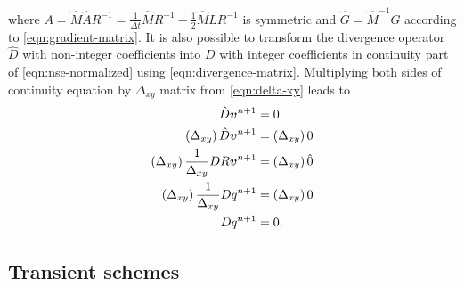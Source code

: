 \documentclass{article}
\numberwithin{equation}{section}
\begin{document}
where $A=\hat{M}\hat{A}R^{-1}=\frac{1}{\Delta t}\hat{M}R^{-1}-\frac{1}{2}\hat{M}\hat{L}R^{-1}$ is symmetric and $\hat{G}=\hat{M}^{-1}G$ according to \cref{eqn:gradient-matrix}. It is also possible to transform the divergence operator $\hat{D}$ with non-integer coefficients into $D$ with integer coefficients in continuity part of \cref{eqn:nse-normalized} using  \cref{eqn:divergence-matrix}. Multiplying both sides of continuity equation by $\Delta _{xy}$ matrix from \cref{eqn:delta-xy} leads to 
\begin{align*}
	\hat{D}\boldsymbol{v}^{n+1}&= 0\notag\\
	\left(\Delta_{xy} \right)\hat{D}\boldsymbol{v}^{n+1}&=\left ( \Delta_{xy}\right ) 0\notag\\
	\left(\Delta_{xy}\right)\frac{1}{\Delta _{xy}}{D}R\boldsymbol{v}^{n+1}&=\left ( \Delta_{xy}\right ) \hat0\notag\\
	\left(\Delta_{xy}\right)\frac{1}{\Delta_{xy}}{D}q^{n+1}&=\left ( \Delta_{xy}\right ) 0\notag\\
	D{q}^{n+1}&=0.
\end{align*}

\subsection{Transient schemes}
\end{document}

